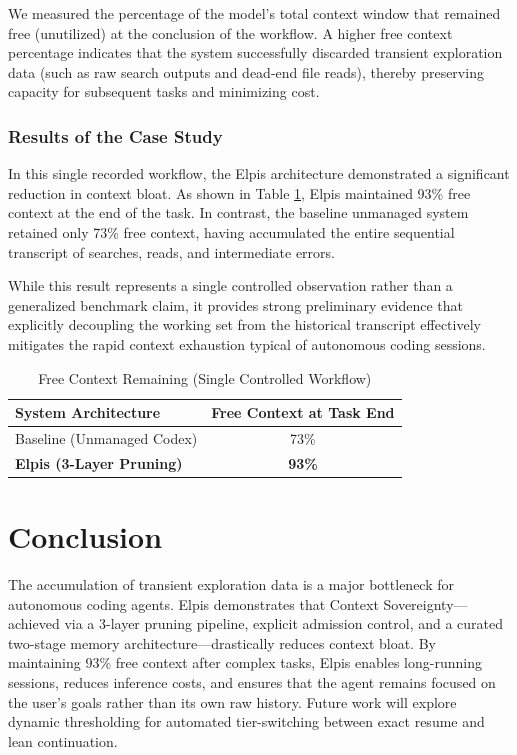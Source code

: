 \documentclass[conference]{IEEEtran}
\begin{document}
We measured the percentage of the model's total context window that remained free (unutilized) at the conclusion of the workflow. A higher free context percentage indicates that the system successfully discarded transient exploration data (such as raw search outputs and dead-end file reads), thereby preserving capacity for subsequent tasks and minimizing cost.

\subsubsection{Results of the Case Study}
In this single recorded workflow, the Elpis architecture demonstrated a significant reduction in context bloat. As shown in Table \ref{tab:results}, Elpis maintained 93\% free context at the end of the task. In contrast, the baseline unmanaged system retained only 73\% free context, having accumulated the entire sequential transcript of searches, reads, and intermediate errors.

While this result represents a single controlled observation rather than a generalized benchmark claim, it provides strong preliminary evidence that explicitly decoupling the working set from the historical transcript effectively mitigates the rapid context exhaustion typical of autonomous coding sessions.

\begin{table}[htbp]
\centering
\caption{Free Context Remaining (Single Controlled Workflow)}
\label{tab:results}
\begin{tabular}{@{}lc@{}}
\toprule
\textbf{System Architecture} & \textbf{Free Context at Task End} \\ \midrule
Baseline (Unmanaged Codex) & 73\% \\
\textbf{Elpis (3-Layer Pruning)} & \textbf{93\%} \\ \bottomrule
\end{tabular}
\end{table}

\section{Conclusion}
The accumulation of transient exploration data is a major bottleneck for autonomous coding agents. Elpis demonstrates that Context Sovereignty---achieved via a 3-layer pruning pipeline, explicit admission control, and a curated two-stage memory architecture---drastically reduces context bloat. By maintaining 93\% free context after complex tasks, Elpis enables long-running sessions, reduces inference costs, and ensures that the agent remains focused on the user's goals rather than its own raw history. Future work will explore dynamic thresholding for automated tier-switching between exact resume and lean continuation.



\end{document}
